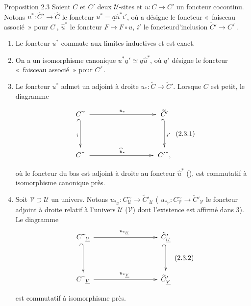 \documentclass[10pt]{../fichiers-configuration-latex/smfart}
\begin{document}
\begin{enonce*}{Proposition 2.3}
Soient $C$ et $C'$ deux $𝒰$-sites et $u:C\rightarrow C'$ un
foncteur cocontinu. Notons $u^{\ast}:\widehat{C}'\rightarrow
\widehat{C}$ le foncteur $u^{\ast}=\underline{a}\widehat{u}^{\ast}i'$,
où a désigne le foncteur « faisceau associé » pour
$C^{\widehat{\phantom{,}}}$, $\widehat{u}^{\ast}$ le foncteur
$F\mapsto F\circ u$, $i'$ le foncteur\pageoriginale d'inclusion
$\widetilde{C}'\rightarrow {C'}^{\widehat{\phantom{,}}}$.
\begin{enumerate}
\renewcommand{\labelenumi}{\theenumi)}
\item Le foncteur $u^{\ast}$ commute aux limites inductives et est
  exact.

\item On a un isomorphisme canonique $u^{\ast}\underline{a}'\simeq
  \underline{a}\widehat{u}^{\ast}$, où $\underline{a}'$ désigne
  le foncteur « faisceau associé » pour
  ${C'}^{\widehat{\phantom{,}}}$.

\item Le foncteur $u^\ast$ admet un adjoint à droite
  $u_{\ast}:\widetilde{C}\rightarrow \widetilde{C}'$. Lorsque $C$ est
  petit, le diagramme
\[\vcenter{
\xymatrix@C=3.25cm@R=1.25cm@M=.25cm{
C\widetilde{\phantom{a}}\ar[r]^{u_\ast} \ar@{_{(}->}[d]_{i}&
\widetilde{C}' \ar@{_{(}->}[d]^{i'}\\
C\widehat{\phantom{a}} \ar[r]^{\widehat{u}_{\ast}}  &
C'\widehat{\phantom{a}}, }}\leqno{(2.3.1)}
\]
où le foncteur du bas est adjoint à droite au foncteur
$\widehat{u}^{\ast}$ (), est commutatif à
isomorphisme canonique près.

\item Soit $𝒱\supset 𝒰$ un univers. Notons
  $u_{\ast_{𝒰}}:
  C^{\sim}_{𝒰}\rightarrow
  \widetilde{C}'_{𝒰}$ (\resp
  $u_{\ast_{𝒱}}:C^{\sim}_{𝒱}\rightarrow
  \widetilde{C}'_{𝒱}$ le foncteur adjoint à droite relatif
  à l'univers $𝒰$ (\resp $𝒱$) dont l'existence est
  affirmé dans $3$). Le diagramme
\[\vcenter{
\xymatrix@C=3.25cm@R=1.25cm@M=.2cm{
C\widetilde{\phantom{a}}_{\underline{U}}
\ar[r]^{u_{\ast_{\underline{U}}}} \ar@{_{(}->}[d]&
\widetilde{C}'_{\underline{U}} \ar@{_{(}->}[d]\\
C\widetilde{\phantom{a}}_{\underline{V}}
\ar[r]^{u_{\ast_{\underline{V}}}}& \widetilde{C}'_{\underline{V}}
}}\leqno{(2.3.2)}
\]
est commutatif à isomorphisme près.
\end{enumerate}
\end{enonce*}
\end{document}
